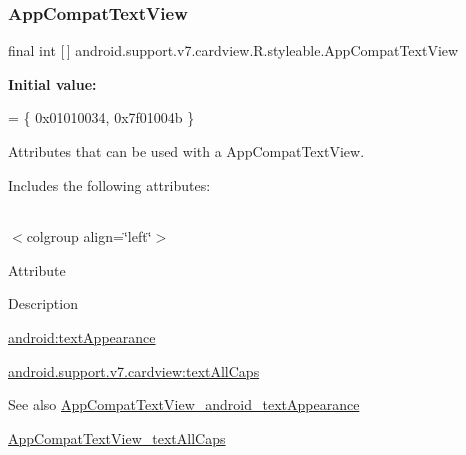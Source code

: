 \subsubsection{\texorpdfstring{App\+Compat\+Text\+View}{AppCompatTextView}}
{\footnotesize\ttfamily final int \mbox{[}$\,$\mbox{]} android.\+support.\+v7.\+cardview.\+R.\+styleable.\+App\+Compat\+Text\+View\hspace{0.3cm}{\ttfamily [static]}}

{\bfseries Initial value\+:}
\begin{DoxyCode}
= \{
            0x01010034, 0x7f01004b
        \}
\end{DoxyCode}
Attributes that can be used with a App\+Compat\+Text\+View. 

Includes the following attributes\+:

\tabulinesep=1mm
\begin{longtabu} spread 0pt [c]{*{0}{|X[-1]}|}
\hline
\end{longtabu}
$<$colgroup align=\char`\"{}left\char`\"{}$>$ 

Attribute

Description 

{\ttfamily \hyperlink{classandroid_1_1support_1_1v7_1_1cardview_1_1R_1_1styleable_ad2f86d9e5df52c4a7da3243d5c2db455}{android\+:text\+Appearance}}

{\ttfamily \hyperlink{classandroid_1_1support_1_1v7_1_1cardview_1_1R_1_1styleable_a933d95eb55173c60b189dd6ed21b2d3a}{android.\+support.\+v7.\+cardview\+:text\+All\+Caps}}

\begin{DoxySeeAlso}{See also}
\hyperlink{classandroid_1_1support_1_1v7_1_1cardview_1_1R_1_1styleable_ad2f86d9e5df52c4a7da3243d5c2db455}{App\+Compat\+Text\+View\+\_\+android\+\_\+text\+Appearance} 

\hyperlink{classandroid_1_1support_1_1v7_1_1cardview_1_1R_1_1styleable_a933d95eb55173c60b189dd6ed21b2d3a}{App\+Compat\+Text\+View\+\_\+text\+All\+Caps} 
\end{DoxySeeAlso}
\mbox{\label{classandroid_1_1support_1_1v7_1_1cardview_1_1R_1_1styleable_ad2f86d9e5df52c4a7da3243d5c2db455}} 
